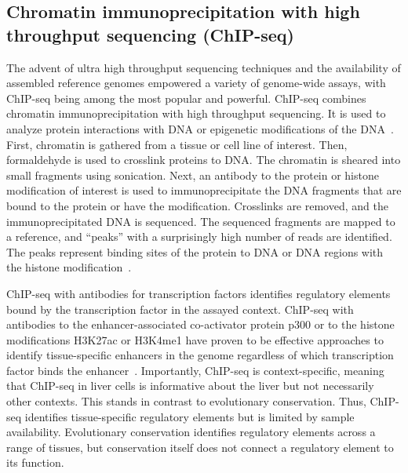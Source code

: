 \subsection{Chromatin immunoprecipitation with high throughput sequencing (ChIP-seq)}
The advent of ultra high throughput sequencing techniques and the availability of assembled reference genomes
empowered a variety of genome-wide assays, with ChIP-seq
being among the most popular and powerful.  ChIP-seq combines chromatin immunoprecipitation with high throughput
sequencing.  It is used to analyze protein interactions with DNA or epigenetic modifications of the DNA~\citep{Park2009}.  First,
chromatin is gathered from a tissue or cell line of interest.  Then, formaldehyde is used to crosslink proteins
to DNA.  The chromatin is sheared into small fragments using sonication.  Next, an antibody to the protein
or histone modification of interest is used to immunoprecipitate the DNA fragments that are bound to the protein
or have the modification.  Crosslinks are removed, and the immunoprecipitated DNA is sequenced.  The sequenced
fragments are mapped to a reference, and ``peaks'' with a surprisingly high number of reads are identified.  The peaks
represent binding sites of the protein to DNA or DNA regions with the histone modification~\citep{Barski2009}.
%

ChIP-seq with antibodies for transcription factors identifies regulatory elements bound by the transcription factor
in the assayed context.  ChIP-seq with antibodies to the enhancer-associated co-activator protein p300 or to the
histone modifications H3K27ac or H3K4me1 have proven to be effective approaches to identify tissue-specific enhancers
in the genome regardless of which transcription factor binds the enhancer~\citep{Cotney2012,Visel2009}.  Importantly, ChIP-seq is context-specific,
meaning that ChIP-seq in liver cells is informative about the liver but not necessarily other contexts.  This stands
in contrast to evolutionary conservation.  Thus, ChIP-seq identifies tissue-specific regulatory elements but is limited by
sample availability.  Evolutionary conservation identifies regulatory elements across a range of tissues, but conservation
itself does not connect a regulatory element to its function.
%

